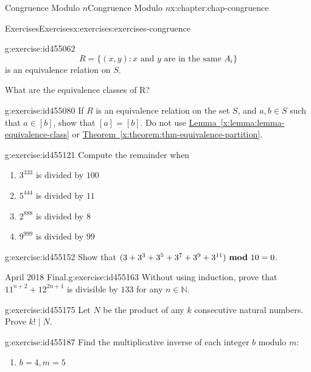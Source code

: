 \documentclass[oneside,10pt,]{book}
\newcommand{\xreffont}{\relax}
\numberwithin{equation}{section}
\newcommand{\mmod}[1]{\ \mathrm{\bf mod}\ #1}
\begin{document}
\begin{chapterptx}{Congruence Modulo \(n\)}{}{Congruence Modulo \(n\)}{}{}{x:chapter:chap-congruence}
\begin{exercises-section}{Exercises}{}{Exercises}{}{}{x:exercises:exercises-congruence}
\begin{divisionexercise}{4}{}{}{g:exercise:id455062}
\begin{equation*}
R = \{(x,y) : x \text{ and } y \text{ are in the same $A_i$}\}
\end{equation*}
is an equivalence relation on \(S\).%
\par
What are the equivalence classes of \textdollar{}R\textdollar{}?%
\end{divisionexercise}%
\begin{divisionexercise}{5}{}{}{g:exercise:id455080}%
If \(R\) is an equivalence relation on the set \(S\), and \(a, b \in S\) such that \(a \in [b]\), show that \([a] = [b]\). Do not use \hyperref[x:lemma:lemma-equivalence-class]{Lemma~{\xreffont\ref{x:lemma:lemma-equivalence-class}}} or \hyperref[x:theorem:thm-equivalence-partition]{Theorem~{\xreffont\ref{x:theorem:thm-equivalence-partition}}}.%
\end{divisionexercise}%
\begin{divisionexercise}{6}{}{}{g:exercise:id455121}%
Compute the remainder when%
\begin{enumerate}[label=(\alph*)]
\item{}\(3^{333}\) is divided by \(100\)%
\item{}\(5^{444}\) is divided by \(11\)%
\item{}\(2^{888}\) is divided by \(8\)%
\item{}\(9^{999}\) is divided by \(99\)%
\end{enumerate}
%
\end{divisionexercise}%
\begin{divisionexercise}{7}{}{}{g:exercise:id455152}%
Show that \((3 + 3^3 + 3^5 + 3^7 + 3^9 + 3^{11}) \mmod{10} = 0\).%
\end{divisionexercise}%
\begin{divisionexercise}{8}{April 2018 Final.}{}{g:exercise:id455163}%
Without using induction, prove that \(11^{n+2} + 12^{2n+1}\) is divisible by \(133\) for any \(n \in \mathbb{N}\).%
\end{divisionexercise}%
\begin{divisionexercise}{9}{}{}{g:exercise:id455175}%
Let \(N\) be the product of any \(k\) consecutive natural numbers. Prove \(k! \mid N\).%
\end{divisionexercise}%
\begin{divisionexercise}{10}{}{}{g:exercise:id455187}%
Find the multiplicative inverse of each integer \(b\) modulo \(m\):%
\begin{enumerate}[label=(\alph*)]
\item{}\(\displaystyle b = 4, m = 5\)%

\end{enumerate}
\end{divisionexercise}
\end{exercises-section}
\end{chapterptx}
\end{document}
